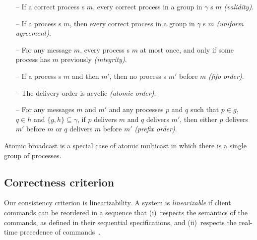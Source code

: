 \begin{itemize}
    
    \item[--] If a correct process \amcast{}s $m$, every correct
      process in a group in $\gamma$ \amdel{}s $m$ \emph{(validity)}.
    
    \item[--] If a process \amdel{}s $m$, then every correct process
      in a group in $\gamma$ \amdel{}s $m$ \emph{(uniform agreement)}.
    
    \item[--] For any message $m$, every process \amdel{}s $m$ at most
      once, and only if some process has \amcast{} $m$ previously
      \emph{(integrity)}.
    
    \item[--] If a process \amcast{}s $m$ and then $m'$, then no process \amdel{}s $m'$ before $m$ \emph{(fifo order)}.

    \item[--] The delivery order is acyclic \emph{(atomic order)}.

    \item[--] For any messages $m$ and $m'$ and any processes $p$ and
      $q$ such that $p \in g$, $q \in h$ and $\{ g, h \} \subseteq
      \gamma$, if $p$ delivers $m$ and $q$ delivers $m'$, then either
      $p$ delivers $m'$ before $m$ or $q$ delivers $m$ before $m'$
      \emph{(prefix order)}.
    
\end{itemize}

Atomic broadcast is a special case of atomic multicast in which there
is a single group of processes.

\subsection{Correctness criterion}
\label{sec:correctcrit}

Our consistency criterion is linearizability.  A system is
\emph{linearizable} if client commands can be reordered
in a sequence that (i)~respects the semantics of the commands, as
defined in their sequential specifications, and (ii)~respects the
real-time precedence of commands~\cite{Attiya04}.


